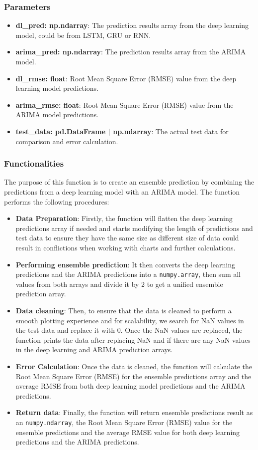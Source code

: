 \documentclass[11pt]{article}
\begin{document}
\subsubsection{Parameters}
\begin{itemize}
    \item \textbf{dl\_pred: np.ndarray}: The prediction results array from the deep learning model, could be from LSTM, GRU or RNN.
    \item \textbf{arima\_pred: np.ndarray}: The prediction results array from the ARIMA model.
    \item \textbf{dl\_rmse: float}: Root Mean Square Error (RMSE) value from the deep learning model predictions.
    \item \textbf{arima\_rmse: float}: Root Mean Square Error (RMSE) value from the ARIMA model predictions.
    \item \textbf{test\_data: pd.DataFrame | np.ndarray}: The actual test data for comparison and error calculation.
\end{itemize}

\subsubsection{Functionalities}
The purpose of this function is to create an ensemble prediction by combining the predictions from a deep learning model with an ARIMA model. The function performs the following procedures:

\begin{itemize}
    \item \textbf{Data Preparation}: Firstly, the function will flatten the deep learning predictions array if needed and starts modifying the length of predictions and test data to ensure they have the same size as different size of data could result in conflictions when working with charts and further calculations.
    \item \textbf{Performing ensemble prediction}: It then converts the deep learning predictions and the ARIMA predictions into a \texttt{numpy.array}, then sum all values from both arrays and divide it by 2 to get a unified ensemble prediction array.
    \item \textbf{Data cleaning}: Then, to ensure that the data is cleaned to perform a smooth plotting experience and for scalability, we search for NaN values in the test data and replace it with 0. Once the NaN values are replaced, the function prints the data after replacing NaN and if there are any NaN values in the deep learning and ARIMA prediction arrays.
    \item \textbf{Error Calculation}: Once the data is cleaned, the function will calculate the Root Mean Square Error (RMSE) for the ensemble predictions array and the average RMSE from both deep learning model predictions and the ARIMA predictions.
    \item \textbf{Return data}: Finally, the function will return ensemble predictions result as an \texttt{numpy.ndarray}, the Root Mean Square Error (RMSE) value for the ensemble predictions and the average RMSE value for both deep learning predictions and the ARIMA predictions.
\end{itemize}
\end{document}
